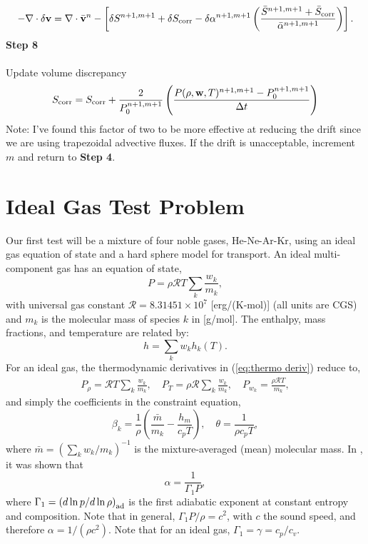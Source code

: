 \documentclass[final]{siamltex}
\def\vb {{\bf v}}
\def\wb {{\bf w}}
\begin{document}
\begin{equation}
-\nabla\cdot\delta\vb = \nabla\cdot\bar{\vb}^n - \left[\delta S^{n+1,m+1} + \delta S_{\rm corr} - \delta\alpha^{n+1,m+1}\left(\frac{\bar{S}^{n+1,m+1} + \bar{S}_{\rm corr}}{\bar{\alpha}^{n+1,m+1}}\right)\right].
\end{equation}
{\bf Step 8}\\ \\
Update volume discrepancy
\begin{equation}
S_{\rm corr} = S_{\rm corr} + \frac{2}{P_0^{n+1,m+1}}\left(\frac{P(\rho,\wb,T)^{n+1,m+1} - P_0^{n+1,m+1}}{\Delta t}\right)
\end{equation}
Note: I've found this factor of two to be more effective at reducing the drift
since we are using trapezoidal advective fluxes.  If the drift is unacceptable,
increment $m$ and return to {\bf Step 4}.

\section{Ideal Gas Test Problem}
Our first test will be a mixture of four noble gases, He-Ne-Ar-Kr,
using an ideal gas equation of state and a hard sphere model for transport.
An ideal multi-component gas has an equation of state,
\begin{equation}
P = \rho\mathcal{R}T\sum_k\frac{w_k}{m_k},
\end{equation}
with universal gas constant $\mathcal{R} = 8.31451\times 10^7$ [erg/(K-mol)] 
(all units are CGS) and $m_k$ is the molecular mass of species $k$ in [g/mol].
The enthalpy, mass fractions, and temperature are related by:
\begin{equation}
h = \sum_k w_k h_k(T).
\end{equation}
For an ideal gas, the thermodynamic derivatives in (\ref{eq:thermo deriv})
reduce to,
\begin{eqnarray}
P_\rho = \mathcal{R} T\sum_k\frac{w_k}{m_k}, \quad
P_T = \rho\mathcal{R}\sum_k\frac{w_k}{m_k}, \quad
P_{w_k} = \frac{\rho\mathcal{R}T}{m_k},
\end{eqnarray}
and simply the coefficients in the constraint equation,
\begin{equation}
\beta_k = \frac{1}{\rho}\left(\frac{\bar{m}}{m_k} - \frac{h_m}{c_p T}\right), \quad
\theta = \frac{1}{\rho c_p T},
\end{equation}
where $\bar{m} = (\sum_k w_k/m_k)^{-1}$ is the mixture-averaged (mean) molecular mass.
In \cite{MAESTROI}, it was shown that
\begin{equation}
\alpha = \frac{1}{\Gamma_1 P},
\end{equation}
where $\Gamma_1 = \left(d\ln{p}/d\ln{\rho}\right)_{\rm ad}$ is the first adiabatic exponent
at constant entropy and composition.  Note that in general, $\Gamma_1 P/\rho = c^2$,
with $c$ the sound speed, and therefore $\alpha = 1/(\rho c^2)$.
Note that for an ideal gas, $\Gamma_1 = \gamma = c_p/c_v$.
\end{document}
